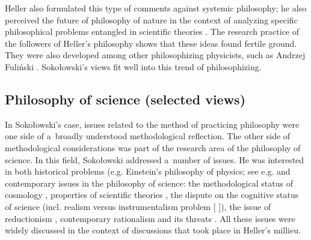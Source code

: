\documentclass[%
  manuscript=article,
  year=2024,
  volume=77,
  doi=00000.000,
]{zfn}
\begin{document}
Heller also formulated this type of comments against systemic philosophy; he also perceived the future of philosophy of nature in the context of analyzing specific philosophical problems entangled in scientific theories 
\parencites[][]{Heller1986Jak}[][]{Heller1990Nowa}. %
 The research practice of the followers of Heller's philosophy shows that these ideas found fertile ground. They were also developed among other philosophizing physicists, such as Andrzej Fuliński 
\parencite[][]{Trombik2023Andrzej}. %
 Sokołowski's views fit well into this trend of philosophizing.



\subsection{ Philosophy of science (selected views)}



In Sokołowski's case, issues related to the method of practicing philosophy were one side of a~broadly understood methodological reflection. The other side of methodological considerations was part of the research area of the philosophy of science. In this field, Sokołowski addressed a~number of issues. He was interested in both historical problems (e.g. Einstein's philosophy of physics; see e.g. 
\parencites[][]{Sokoowski1987Alberta}[][]{Sokoowski1987Mysl1}[][]{Sokoowski1987Mysl2} %
 and contemporary issues in the philosophy of science: the methodological status of cosmology 
\parencites[][]{Sokoowski1978Czy}[][]{Sokoowski2015Granice}, %
 properties of scientific theories 
\parencites[][]{Sokoowski2006Teorie}[][]{Sokoowski2007Czowiek}, %
 the dispute on the cognitive status of science (incl. realism versus instrumentalism problem [
\parencite[][]{Sokoowski1986Pluralizm}%
]), the issue of reductionism 
\parencites[][]{Sokoowski1996W}[][]{Sokoowski1999Maa}[][]{Sokoowski2006Teorie}, %
 contemporary rationalism and its threats 
\parencites[][]{Sokoowski2001Wspoczesne}[][]{Sokoowski2006Alicja}. %
 All these issues were widely discussed in the context of discussions that took place in Heller's millieu.
\end{document}
